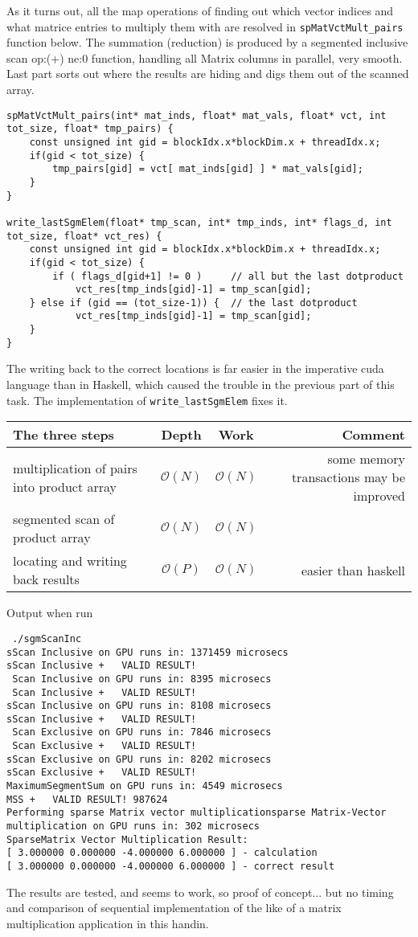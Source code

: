 \documentclass[a4paper,10pt]{article}
\begin{document}
As it turns out, all the map operations of finding out which vector indices and what matrice entries to multiply them with are resolved in \texttt{spMatVctMult\_pairs} function below.
The summation (reduction) is produced by a segmented inclusive scan op:(+) ne:$0$ function, handling all Matrix columns in parallel, very smooth. Last part sorts out where the results are hiding and digs them out of the scanned array.
\begin{verbatim}
spMatVctMult_pairs(int* mat_inds, float* mat_vals, float* vct, int tot_size, float* tmp_pairs) {
    const unsigned int gid = blockIdx.x*blockDim.x + threadIdx.x;
    if(gid < tot_size) {
        tmp_pairs[gid] = vct[ mat_inds[gid] ] * mat_vals[gid];
    }
}

write_lastSgmElem(float* tmp_scan, int* tmp_inds, int* flags_d, int tot_size, float* vct_res) {
    const unsigned int gid = blockIdx.x*blockDim.x + threadIdx.x;
    if(gid < tot_size) {
        if ( flags_d[gid+1] != 0 )     // all but the last dotproduct
            vct_res[tmp_inds[gid]-1] = tmp_scan[gid];
    } else if (gid == (tot_size-1)) {  // the last dotproduct
            vct_res[tmp_inds[gid]-1] = tmp_scan[gid];
    }
}
\end{verbatim}
The writing back to the correct locations is far easier in the imperative cuda language than in Haskell, which caused the trouble in the previous part of this task. The implementation of \texttt{write\_lastSgmElem} fixes it.

\begin{tabular}{l|cc|r}
The three steps & Depth & Work & Comment\\ \hline
multiplication of pairs into product array & $\mathcal{O}(N)$ & $\mathcal{O}(N)$ & some memory transactions may be improved \\
segmented scan of product array & $\mathcal{O}(N)$ & $\mathcal{O}(N)$ & \\
locating and writing back results & $\mathcal{O}(P)$ & $\mathcal{O}(N)$ & easier than haskell \\ \hline
\end{tabular}

Output when run
\begin{verbatim}
 ./sgmScanInc
sScan Inclusive on GPU runs in: 1371459 microsecs
sScan Inclusive +   VALID RESULT!
 Scan Inclusive on GPU runs in: 8395 microsecs
 Scan Inclusive +   VALID RESULT!
sScan Inclusive on GPU runs in: 8108 microsecs
sScan Inclusive +   VALID RESULT!
 Scan Exclusive on GPU runs in: 7846 microsecs
 Scan Exclusive +   VALID RESULT!
sScan Exclusive on GPU runs in: 8202 microsecs
sScan Exclusive +   VALID RESULT!
MaximumSegmentSum on GPU runs in: 4549 microsecs
MSS +   VALID RESULT! 987624
Performing sparse Matrix vector multiplicationsparse Matrix-Vector multiplication on GPU runs in: 302 microsecs
SparseMatrix Vector Multiplication Result:
[ 3.000000 0.000000 -4.000000 6.000000 ] - calculation
[ 3.000000 0.000000 -4.000000 6.000000 ] - correct result
\end{verbatim}
The results are tested, and seems to work, so proof of concept... but no timing and comparison of sequential implementation of the like of a matrix multiplication application in this handin.
\end{document}

